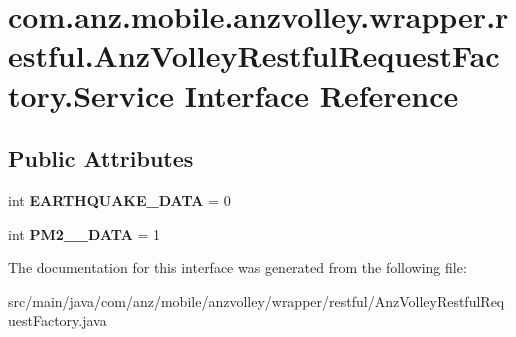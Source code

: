 \hypertarget{interfacecom_1_1anz_1_1mobile_1_1anzvolley_1_1wrapper_1_1restful_1_1_anz_volley_restful_request_factory_1_1_service}{\section{com.\+anz.\+mobile.\+anzvolley.\+wrapper.\+restful.\+Anz\+Volley\+Restful\+Request\+Factory.\+Service Interface Reference}
\label{interfacecom_1_1anz_1_1mobile_1_1anzvolley_1_1wrapper_1_1restful_1_1_anz_volley_restful_request_factory_1_1_service}
}
\subsection*{Public Attributes}
\begin{DoxyCompactItemize}
\item 
\hypertarget{interfacecom_1_1anz_1_1mobile_1_1anzvolley_1_1wrapper_1_1restful_1_1_anz_volley_restful_request_factory_1_1_service_ad9f177a2a4f8c7e9fa650c336d5a4031}{int {\bfseries E\+A\+R\+T\+H\+Q\+U\+A\+K\+E\+\_\+\+D\+A\+T\+A} = 0}\label{interfacecom_1_1anz_1_1mobile_1_1anzvolley_1_1wrapper_1_1restful_1_1_anz_volley_restful_request_factory_1_1_service_ad9f177a2a4f8c7e9fa650c336d5a4031}

\item 
\hypertarget{interfacecom_1_1anz_1_1mobile_1_1anzvolley_1_1wrapper_1_1restful_1_1_anz_volley_restful_request_factory_1_1_service_a2ba95a8f05ef11a8e62b6afc22000b47}{int {\bfseries P\+M2\+\_\+\_\+\+D\+A\+T\+A} = 1}\label{interfacecom_1_1anz_1_1mobile_1_1anzvolley_1_1wrapper_1_1restful_1_1_anz_volley_restful_request_factory_1_1_service_a2ba95a8f05ef11a8e62b6afc22000b47}

\end{DoxyCompactItemize}


The documentation for this interface was generated from the following file\+:\begin{DoxyCompactItemize}
\item 
src/main/java/com/anz/mobile/anzvolley/wrapper/restful/Anz\+Volley\+Restful\+Request\+Factory.\+java\end{DoxyCompactItemize}
